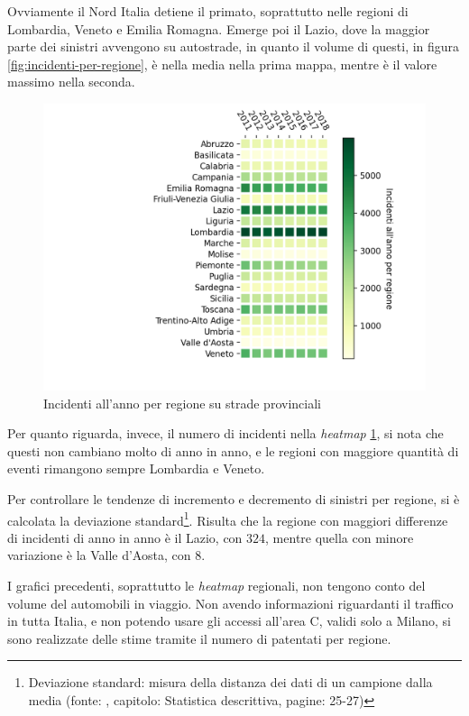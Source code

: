 \documentclass[a4paper]{report}
\newcommand{\quotestyle}[1]{\textit{#1}}
\begin{document}
Ovviamente il Nord Italia detiene il primato, 
soprattutto nelle regioni di Lombardia, Veneto e Emilia Romagna. 
Emerge poi il Lazio, dove la maggior parte dei sinistri avvengono su autostrade, 
in quanto il volume di questi, in figura \ref{fig:incidenti-per-regione}, 
è nella media nella prima mappa, mentre è il valore massimo nella seconda. 

\begin{figure}
    \includegraphics[width=\linewidth]{../src/incidenti/incidenti_aci/mappe_regioni/regioni_heatmap.png}
    \caption{Incidenti all'anno per regione su strade provinciali}
    \label{fig:regione-heatmap}
\end{figure}

Per quanto riguarda, invece, il numero di incidenti 
nella \quotestyle{heatmap} \ref{fig:regione-heatmap}, 
si nota che questi non cambiano molto di anno in anno, e le regioni con maggiore quantità 
di eventi rimangono sempre Lombardia e Veneto. 

Per controllare le tendenze di incremento e decremento di sinistri per regione, 
si è calcolata la deviazione standard\footnote{Deviazione standard: 
misura della distanza dei dati di un campione dalla media 
(fonte: \cite{PROB_E_STATISTICA:1}, 
capitolo: Statistica descrittiva, pagine: 25-27)}. 
Risulta che la regione con maggiori differenze di incidenti di anno in anno 
è il Lazio, con $324$, mentre quella con minore 
variazione è la Valle d'Aosta, con $8$. 

I grafici precedenti, soprattutto le \quotestyle{heatmap} regionali, non tengono conto del 
volume del automobili in viaggio. 
Non avendo informazioni riguardanti il traffico in tutta Italia, 
e non potendo usare gli accessi all'area C, validi solo a Milano, si sono realizzate 
delle stime tramite il numero di patentati per regione. 
\end{document}
